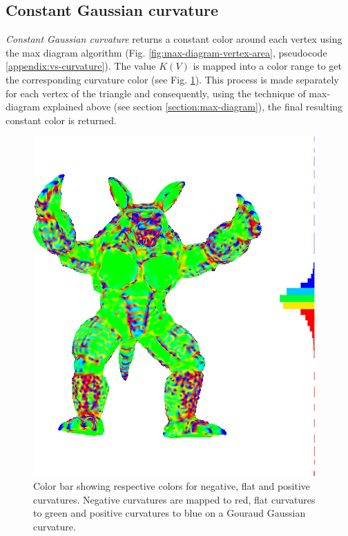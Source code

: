 \subsection{Constant Gaussian curvature}
\label{section:gc-curvature}
\textit{Constant Gaussian curvature} returns a constant color around each vertex using the max diagram algorithm (Fig. \ref{fig:max-diagram-vertex-area}, pseudocode \ref{appendix:vs-curvature}). The value $K(V)$ is mapped into a color range to get the corresponding curvature color (see Fig. \ref{fig:color-range-curvature}). This process is made separately for each vertex of the triangle and consequently, using the technique of max-diagram explained above (see section \ref{section:max-diagram}), the final resulting constant color is returned.
\begin{figure}[!h]
    \centering
    \includegraphics[scale=0.4]{images/gradient-curvature.png}
    \caption{Color bar showing respective colors for negative, flat and positive curvatures. Negative curvatures are mapped to red, flat curvatures to green and positive curvatures to blue on a Gouraud Gaussian curvature.} \label{fig:color-range-curvature}
\end{figure}


